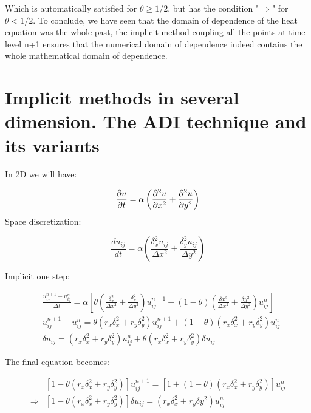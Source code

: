 Which is automatically satisfied for $\theta \geq 1/2$, but has the condition "$\Rightarrow$" for $\theta <1/2$. To conclude, we have seen that the domain of dependence of the heat equation was the whole past, the implicit method coupling all the points at time level n+1 ensures that the numerical domain of dependence indeed contains the whole mathematical domain of dependence.  

\section{Implicit methods in several dimension. The ADI technique and its variants}
In 2D we will have: 

\begin{equation}
\frac{\partial u}{\partial t} = \alpha \left( \frac{\partial ^2u}{\partial x^2}+ \frac{\partial^2 u}{\partial y^2} \right)
\end{equation}
Space discretization: 

\begin{equation}
\frac{d u_{ij}}{d t} = \alpha \left( \frac{\delta _x^2 u_{ij}}{\Delta x^2} +\frac{\delta _ y^2 u_{ij}}{\Delta y^2}  \right)
\end{equation}

Implicit one step: 

\begin{equation}
\begin{aligned}
&\frac{u_{ij}^{n+1}-u_{ij}^n}{\Delta t} = \alpha \left[\theta \left(\frac{\delta _x^2}{\Delta x^2} + \frac{ \delta _y^2}{\Delta y^2}\right)u_{ij}^{n+1} + (1-\theta )\left(\frac{\delta x^2}{\Delta x^2}+ \frac{\delta y^2}{\Delta y^2}\right)u_{ij}^{n}\right]\\
&u_{ij}^{n+1}-u_{ij}^{n} = \theta (r_x\delta _x^2 + r_y\delta _y^2)u_{ij}^{n+1}+ (1-\theta)(r_x \delta _x ^2 + r_y \delta _y ^2)u_{ij}^{n}\\
&\delta u_{ij} = (r_x \delta _x^2 +r_y \delta _y^2)u_{ij}^{n} + \theta (r_x \delta _x^2 + r_y \delta _y ^2)\delta u_{ij}
\end{aligned}
\end{equation}

The final equation becomes: 

\begin{equation}
\begin{aligned}
&[1-\theta (r_x \delta _x^2+r_y\delta _y^2)]u_{ij}^{n+1} = [1+(1-\theta)(r_x\delta _x^2+r_y \delta _y^2)]u_{ij}^{n}\\
\Rightarrow&[1-\theta (r_x \delta _x^2+r_y\delta _y^2)]\delta u_{ij} = (r_x\delta _x^2 + r_y\delta y^2)u_{ij}^n
\end{aligned}
\end{equation}


